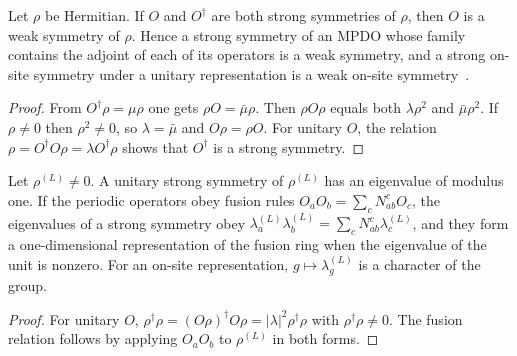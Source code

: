 \begin{lemma}\label{thm:mpdo_strong_implies_weak}
    \leanok
    Let $\rho$ be Hermitian. If $O$ and $O^\dagger$ are both strong
    symmetries of $\rho$, then $O$ is a weak symmetry of $\rho$. Hence a
    strong symmetry of an MPDO whose family contains the adjoint of each of
    its operators is a weak symmetry, and a strong on-site symmetry under a
    unitary representation is a weak on-site
    symmetry~\cite{Sun2025Anomalous}.
\end{lemma}

\begin{proof}\leanok
    From $O^\dagger\rho=\mu\rho$ one gets $\rho O=\bar\mu\rho$. Then
    $\rho O\rho$ equals both $\lambda\rho^2$ and $\bar\mu\rho^2$. If
    $\rho\neq 0$ then $\rho^2\neq 0$, so $\lambda=\bar\mu$ and
    $O\rho=\rho O$. For unitary $O$, the relation $\rho=O^\dagger O\rho=\lambda
        O^\dagger\rho$ shows that $O^\dagger$ is a strong symmetry.
\end{proof}

\begin{lemma}\label{thm:mpdo_strong_eigenvalues}
    \leanok
    Let $\rho^{(L)}\neq 0$. A unitary strong symmetry of $\rho^{(L)}$ has an
    eigenvalue of modulus one. If the periodic operators obey fusion rules
    $O_aO_b=\sum_c N_{ab}^cO_c$, the eigenvalues of a strong symmetry obey
    $\lambda_a^{(L)}\lambda_b^{(L)}=\sum_cN_{ab}^c\lambda_c^{(L)}$, and they
    form a one-dimensional representation of the fusion ring when the
    eigenvalue of the unit is nonzero. For an on-site representation,
    $g\mapsto\lambda_g^{(L)}$ is a character of the group.
\end{lemma}

\begin{proof}\leanok
    For unitary $O$, $\rho^\dagger\rho=(O\rho)^\dagger O\rho
        =|\lambda|^2\rho^\dagger\rho$ with $\rho^\dagger\rho\neq 0$. The fusion
    relation follows by applying $O_aO_b$ to $\rho^{(L)}$ in both forms.
\end{proof}

